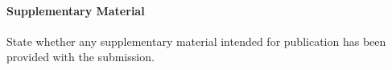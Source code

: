 \documentclass{CUP-JNL-DAP}%
\begin{document}
\begin{Backmatter}
\paragraph{Supplementary Material}
State whether any supplementary material intended for publication has been provided with the submission.


% 



\end{Backmatter}
\end{document}
